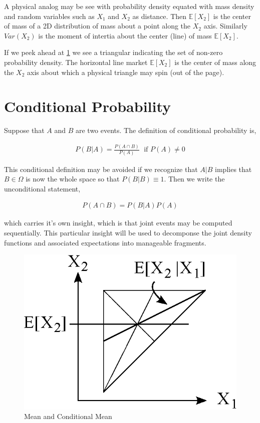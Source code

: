 A physical analog may be see with probability density equated with mass density and random variables such as $X_1$ and $X_2$ as distance. Then $\mathbb{E}[X_2]$ is the center of mass of a 2D distribution of mass about a point along the $X_2$ axis. Similarly $Var(X_2)$ is the moment of intertia about the center (line) of mass $\mathbb{E}[X_2]$.

If we peek ahead at \ref{fig:ConditionalExpectation} we see a triangular indicating the set of non-zero probability density. The horizontal line market $\mathbb{E}[X_2]$ is the center of mass along the $X_2$ axis about which a physical triangle may spin (out of the page).

\section{Conditional Probability}

Suppose that $A$ and $B$ are two events. The definition of conditional probability is,

\begin{align*}
P(B | A) = \frac{P(A \cap B)}{P(A)} \; \text{ if $P(A) \ne 0$}
\end{align*}

This conditional definition may be avoided if we recognize that $A | B$ implies that $B \in \Omega$ is now the whole space so that $P(B | B) \equiv 1$. Then we write the unconditional statement,

\begin{align*}
P(A \cap B) = P(B | A) P(A)
\end{align*} 

which carries it's own insight, which is that joint events may be computed sequentially. This particular insight will be used to decomponse the joint density functions and associated expectations into manageable fragments.

\begin{figure}
  \centering
  \includegraphics{Images/ConditionalExpectation.eps}
  \caption[Mean and Conditional Mean]
          {Mean and Conditional Mean}
  \label{fig:ConditionalExpectation}
\end{figure}

